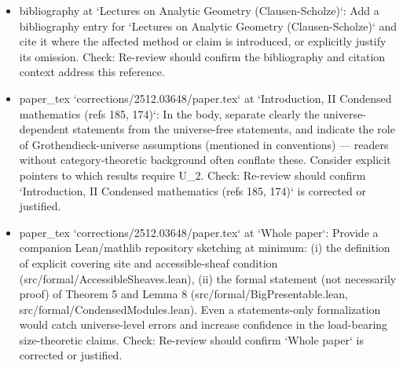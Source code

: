 \documentclass[11pt]{article}
\begin{document}
\begin{itemize}[leftmargin=*]
  \item [open] bibliography at `Lectures on Analytic Geometry (Clausen-Scholze)`: Add a bibliography entry for `Lectures on Analytic Geometry (Clausen-Scholze)` and cite it where the affected method or claim is introduced, or explicitly justify its omission. Check: Re-review should confirm the bibliography and citation context address this reference.
  \item [open] paper\_tex `corrections/2512.03648/paper.tex` at `Introduction, II Condensed mathematics (refs 185, 174)`: In the body, separate clearly the universe-dependent statements from the universe-free statements, and indicate the role of Grothendieck-universe assumptions (mentioned in conventions) — readers without category-theoretic background often conflate these. Consider explicit pointers to which results require U\_2. Check: Re-review should confirm `Introduction, II Condensed mathematics (refs 185, 174)` is corrected or justified.
  \item [open] paper\_tex `corrections/2512.03648/paper.tex` at `Whole paper`: Provide a companion Lean/mathlib repository sketching at minimum: (i) the definition of explicit covering site and accessible-sheaf condition (src/formal/AccessibleSheaves.lean), (ii) the formal statement (not necessarily proof) of Theorem 5 and Lemma 8 (src/formal/BigPresentable.lean, src/formal/CondensedModules.lean). Even a statements-only formalization would catch universe-level errors and increase confidence in the load-bearing size-theoretic claims. Check: Re-review should confirm `Whole paper` is corrected or justified.
\end{itemize}
\end{document}
